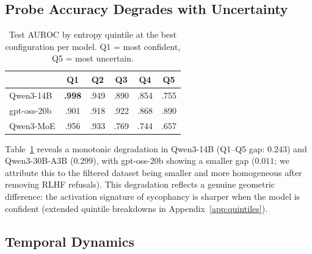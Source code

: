\documentclass[11pt]{article}
\begin{document}
\subsection{Probe Accuracy Degrades with Uncertainty}

\begin{table}[t]
\caption{Test AUROC by entropy quintile at the best configuration per model. Q1 = most confident, Q5 = most uncertain.}
\label{tab:quintiles}
\begin{center}
\begin{small}
\begin{sc}
\begin{tabular}{lccccc}
\toprule
 & Q1 & Q2 & Q3 & Q4 & Q5 \\
\midrule
Qwen3-14B    & \textbf{.998} & .949 & .890 & .854 & .755 \\
gpt-oss-20b  & .901 & .918 & .922 & .868 & .890 \\
Qwen3-MoE    & .956 & .933 & .769 & .744 & .657 \\
\bottomrule
\end{tabular}
\end{sc}
\end{small}
\end{center}
\end{table}

Table~\ref{tab:quintiles} reveals a monotonic degradation in Qwen3-14B (Q1--Q5 gap: $0.243$) and Qwen3-30B-A3B ($0.299$), with gpt-oss-20b showing a smaller gap ($0.011$; we attribute this to the filtered dataset being smaller and more homogeneous after removing RLHF refusals).
This degradation reflects a genuine geometric difference: the activation signature of sycophancy is sharper when the model is confident (extended quintile breakdowns in Appendix~\ref{app:quintiles}).

\subsection{Temporal Dynamics}
\end{document}
